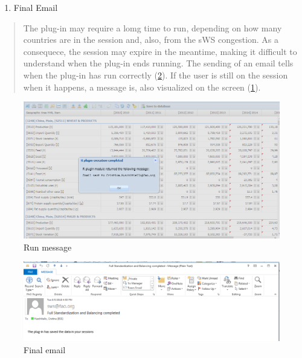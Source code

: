 \documentclass[]{article}
\providecommand{\tightlist}{%
  \setlength{\itemsep}{0pt}\setlength{\parskip}{0pt}}
\begin{document}
\begin{enumerate}
\def\labelenumi{\arabic{enumi}.}
\setcounter{enumi}{3}
\tightlist
\item
  Final Email
\end{enumerate}

\begin{quote}
The plug-in may require a lomg time to run, depending on how many
countries are in the session and, also, from the sWS congestion. As a
consequece, the session may expire in the meantime, making it difficult
to understand when the plug-in ends running. The sending of an email
tells when the plug-in has run correctly (\ref{fig:f34}). If the user is
still on the session when it happens, a message is, also visualized on
the screen (\ref{fig:f33}).
\end{quote}

\begin{figure}[H]

{\centering \includegraphics[width=1\linewidth]{images/standPlugin/33_finalEmailmessage} 

}

\caption{\label{fig:f33}Run message}\label{fig:f33}
\end{figure}

\begin{figure}[H]

{\centering \includegraphics[width=1\linewidth]{images/standPlugin/34_finalEmail} 

}

\caption{\label{fig:f34}Final email}\label{fig:f34}
\end{figure}
\end{document}
